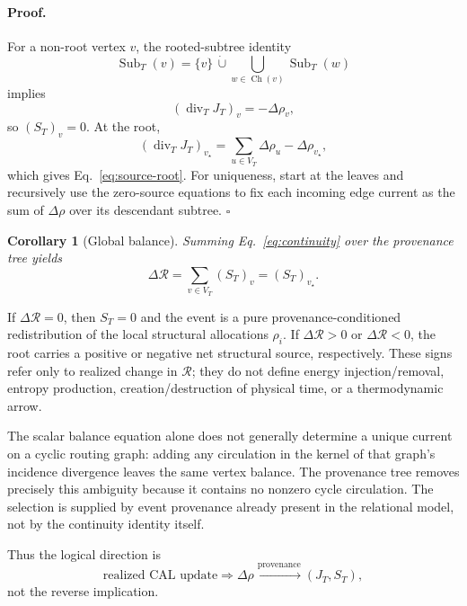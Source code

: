 \documentclass[aip,jmp,amsmath,amssymb,reprint]{revtex4-2}
\newtheorem{corollary}{Corollary}
\newcommand{\Rcal}{\mathcal{R}}
\newcommand{\divT}{\operatorname{div}_{T}}
\begin{document}
\paragraph*{Proof.}
For a non-root vertex $v$, the rooted-subtree identity
\begin{equation}
\operatorname{Sub}_T(v)
=
\{v\}\,\dot\cup\!\bigcup_{w\in\operatorname{Ch}(v)}\operatorname{Sub}_T(w)
\end{equation}
implies
\begin{equation}
(\divT J_T)_v=-\Delta\rho_v,
\end{equation}
so $(S_T)_v=0$. At the root,
\begin{equation}
(\divT J_T)_{v_\star}
=\sum_{u\in V_T}\Delta\rho_u-\Delta\rho_{v_\star},
\end{equation}
which gives Eq.~\eqref{eq:source-root}. For uniqueness, start at the leaves and recursively use the zero-source equations to fix each incoming edge current as the sum of $\Delta\rho$ over its descendant subtree. \hfill$\square$

\begin{corollary}[Global balance]\label{cor:global-balance}
Summing Eq.~\eqref{eq:continuity} over the provenance tree yields
\begin{equation}
\boxed{
\Delta\Rcal=\sum_{v\in V_T}(S_T)_v=(S_T)_{v_\star}.
}
\label{eq:global-balance}
\end{equation}
\end{corollary}

If $\Delta\Rcal=0$, then $S_T=0$ and the event is a pure provenance-conditioned redistribution of the local structural allocations $\rho_i$. If $\Delta\Rcal>0$ or $\Delta\Rcal<0$, the root carries a positive or negative net structural source, respectively. These signs refer only to realized change in $\Rcal$; they do not define energy injection/removal, entropy production, creation/destruction of physical time, or a thermodynamic arrow.

The scalar balance equation alone does not generally determine a unique current on a cyclic routing graph: adding any circulation in the kernel of that graph's incidence divergence leaves the same vertex balance. The provenance tree removes precisely this ambiguity because it contains no nonzero cycle circulation. The selection is supplied by event provenance already present in the relational model, not by the continuity identity itself.

Thus the logical direction is
\begin{equation}
\boxed{
\text{realized CAL update}
\Longrightarrow
\Delta\rho
\xrightarrow{\text{provenance}}
(J_T,S_T),
}
\label{eq:provenance-logic}
\end{equation}
not the reverse implication.
\end{document}
